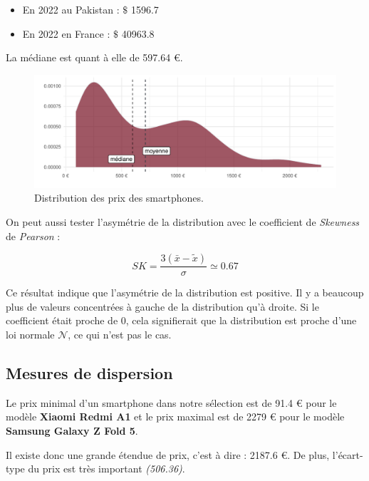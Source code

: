 \documentclass[
  12pt,
]{report}
\providecommand{\tightlist}{%
  \setlength{\itemsep}{0pt}\setlength{\parskip}{0pt}}\usepackage{longtable,booktabs,array}
\begin{document}
\begin{itemize}
\tightlist
\item
  En 2022 au Pakistan : \(\$\) 1596.7
\item
  En 2022 en France : \(\$\) 40963.8
\end{itemize}

La médiane est quant à elle de 597.64 €.

\begin{figure}[H]

{\centering \includegraphics{report_files/figure-pdf/density_phones-1.pdf}

}

\caption{Distribution des prix des smartphones.}

\end{figure}%

On peut aussi tester l'asymétrie de la distribution avec le coefficient
de \emph{Skewness} de \emph{Pearson} :

\[SK = \dfrac{3(\bar{x} - \tilde{x})}{\sigma} \simeq 0.67\]

Ce résultat indique que l'asymétrie de la distribution est positive. Il
y a beaucoup plus de valeurs concentrées à gauche de la distribution
qu'à droite. Si le coefficient était proche de 0, cela signifierait que
la distribution est proche d'une loi normale \(\mathcal{N}\), ce qui
n'est pas le cas.

\subsection{Mesures de dispersion}\label{mesures-de-dispersion}

Le prix minimal d'un smartphone dans notre sélection est de 91.4 € pour
le modèle \textbf{Xiaomi Redmi A1} et le prix maximal est de 2279 € pour
le modèle \textbf{Samsung Galaxy Z Fold 5}.

Il existe donc une grande étendue de prix, c'est à dire : 2187.6 €. De
plus, l'écart-type du prix est très important \emph{(506.36)}.
\end{document}
